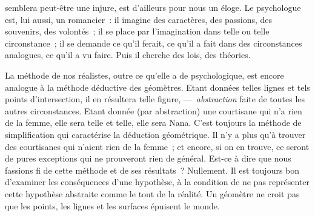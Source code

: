 \documentclass[french,twoside]{book} %
\begin{document}
semblera peut-être une injure, est d’ailleurs pour nous un éloge. Le psychologue est, lui aussi, un romancier : il imagine des caractères, des passions, des souvenirs, des volontés ; il se place par l’imagination dans telle ou telle circonstance ; il se demande ce qu’il ferait, ce qu’il a fait dans des circonstances analogues, ce qu’il a vu faire. Puis il cherche des lois, des théories.\par
La méthode de nos réalistes, outre ce qu’elle a de psychologique, est encore analogue à la méthode déductive des géomètres. Etant données telles lignes et tels points d’intersection, il en résultera telle figure, — \emph{abstraction} faite de toutes les autres circonstances. Etant donnée (par abstraction) une courtisane qui n’a rien de la femme, elle sera telle et telle, elle sera Nana. C’est toujours la méthode de simplification qui caractérise la déduction géométrique. Il n’y a plus qu’à trouver des courtisanes qui n’aient rien de la femme ; et encore, si on en trouve, ce seront de pures exceptions qui ne prouveront rien de général. Est-ce à dire que nous fassions fi de cette méthode et de ses résultats ? Nullement. Il est toujours bon d’examiner les conséquences d’une hypothèse, à la condition de ne pas représenter cette hypothèse abstraite comme le tout de la réalité. Un géomètre ne croit pas que les points, les lignes et les surfaces épuisent le monde.\par
\end{document}
